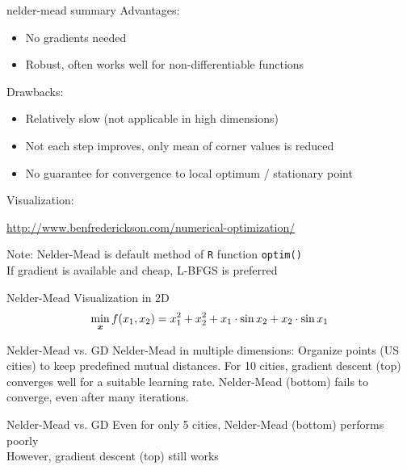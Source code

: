 \documentclass[11pt,compress,t,notes=noshow, xcolor=table]{beamer}
\begin{document}
\begin{framev}{nelder-mead summary}
Advantages:
\begin{itemize}
\item No gradients needed
\item Robust, often works well for non-differentiable functions
\end{itemize}
Drawbacks:
\begin{itemize}
\item Relatively slow (not applicable in high dimensions)
\item Not each step improves, only mean of corner values is reduced
\item No guarantee for convergence to local optimum / stationary point
\end{itemize}
Visualization:
\begin{center}
\url{http://www.benfrederickson.com/numerical-optimization/}
\end{center}
\spacer
Note: Nelder-Mead is default method of \texttt{R} function \texttt{optim()}\\
If gradient is available and cheap, L-BFGS is preferred
\end{framev}


\begin{framev}{Nelder-Mead Visualization in 2D}
$$\min_{\bm{x}} f(x_1,x_2) = x_1^{2} + x_2^{2} + x_1\cdot \sin x_2 + x_2 \cdot \sin x_1 $$ 
\end{framev}


\begin{framev}{Nelder-Mead vs. GD}
{\footnotesize Nelder-Mead in multiple dimensions:
Organize points (US cities) to keep predefined mutual distances.
For 10 cities, gradient descent (top) converges well for a suitable learning rate.
Nelder-Mead (bottom) fails to converge, even after many iterations.}
\end{framev}


\begin{framev}{Nelder-Mead vs. GD}
{\footnotesize Even for only 5 cities, Nelder-Mead (bottom) performs poorly\\
However, gradient descent (top) still works}
\end{framev}

\endlecture
\end{document}
